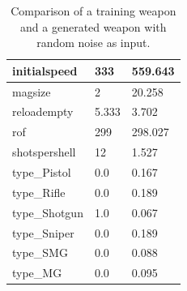 \documentclass[MGS,Master,english]{twbook}%
\begin{document}
\begin{table}[!ht]
\begin{tabular}{|l|p{3.6cm}|p{3.6cm}|}
		initialspeed             & 333                  & 559.643                   \\ \hline
		magsize                  & 2                    & 20.258                    \\ \hline
		reloadempty              & 5.333                & 3.702                     \\ \hline
		rof                      & 299                  & 298.027                   \\ \hline
		shotspershell            & 12                   & 1.527                     \\ \hline
		type\_Pistol             & 0.0                  & 0.167                     \\ \hline
		type\_Rifle              & 0.0                  & 0.189                     \\ \hline
		type\_Shotgun            & 1.0                  & 0.067                     \\ \hline
		type\_Sniper       & 0.0                  & 0.189                     \\ \hline
		type\_SMG     & 0.0                  & 0.088                     \\ \hline
		type\_MG     & 0.0                  & 0.095                     \\ \hline
	\end{tabular}
	\caption{Comparison of a training weapon and a generated weapon with random noise as input.}
	\label{vae::randomInputGeneration}
\end{table}
\end{document}
